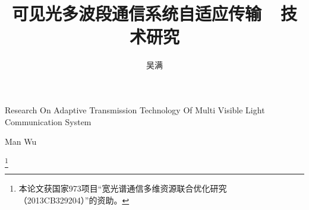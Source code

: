 \documentclass[master]{seuthesis} %
\begin{document}
\title{可见光多波段通信系统自适应传输\ \ 技术研究}{}{Research On Adaptive Transmission Technology Of Multi Visible Light Communication System}{}
\author{吴满}{Man Wu}

\authorizedate{}
\address{东南大学四牌楼校区李文正楼}
\thanks{本论文获国家973项目“宽光谱通信多维资源联合优化研究（2013CB329204）”的资助。}
\maketitle




\tableofcontents
\listoffigures
\listoftables

\begin{Main}
%   
%   
%   
%   
   
%   
\end{Main}



%
%
%
\end{document}
